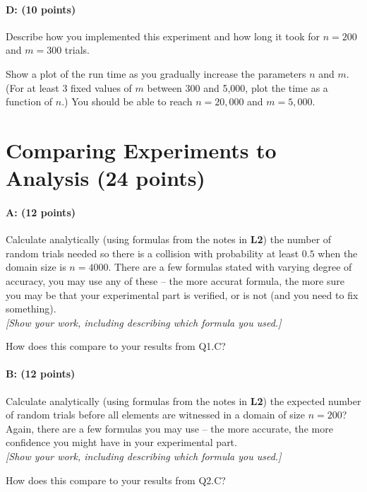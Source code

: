 \documentclass[11pt]{article}
\begin{document}
\paragraph{D: (10 points)} 
Describe how you implemented this experiment and how long it took for $n=200$ and $m=300$ trials.  

Show a plot of the run time as you gradually increase the parameters $n$ and $m$.  
(For at least 3 fixed values of $m$ between 300 and 5,000, plot the time as a function of $n$.)
You should be able to reach $n = 20{,}000$ and $m = 5{,}000$.  

\section{Comparing Experiments to Analysis (24 points)}

\paragraph{A: (12 points)}
Calculate analytically (using formulas from the notes in \textbf{L2}) the number of random trials needed so there is a collision with probability at least $0.5$ when the domain size is $n = 4000$.  There are a few formulas stated with varying degree of accuracy, you may use any of these -- the more accurat formula, the more sure you may be that your experimental part is verified, or is not (and you need to fix something).  
\\ \emph{[Show your work, including describing which formula you used.]}

How does this compare to your results from \textsf{Q1.C}?  

\paragraph{B: (12 points)}
Calculate analytically (using formulas from the notes in \textbf{L2}) the expected number of random trials before all elements are witnessed in a domain of size $n=200$?  Again, there are a few formulas you may use -- the more accurate, the more confidence you might have in your experimental part.  
\\ \emph{[Show your work, including describing which formula you used.]}

How does this compare to your results from \textsf{Q2.C}?
\end{document}
